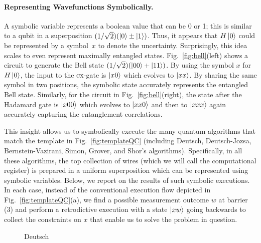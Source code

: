 \documentclass{article}
\newcommand{\cx}{\textsc{cx}}
\begin{document}
\begin{refsection}
\paragraph*{Representing Wavefunctions Symbolically.}
A symbolic variable represents a boolean value that can be 0 or 1;
this is similar to a qubit in a superposition $(1/\sqrt{2}) (\ket{0}
\pm \ket{1})$. Thus, it appears that $H\ket{0}$ could be represented
by a symbol~$x$ to denote the uncertainty. Surprisingly, this idea
scales to even represent maximally entangled
states. Fig.~\ref{fig:bell}(left) shows a circuit to generate the Bell
state $(1/\sqrt{2}) (\ket{00} + \ket{11})$. By using the symbol $x$
for $H\ket{0}$, the input to the \cx-gate is $\ket{x0}$ which
evolves to $\ket{xx}$. By sharing the same symbol in two positions,
the symbolic state accurately represents the entangled Bell
state. Similarly, for the circuit in Fig.~\ref{fig:bell}(right), the
state after the Hadamard gate is $\ket{x00}$ which evolves to
$\ket{xx0}$ and then to $\ket{xxx}$ again accurately capturing the
entanglement correlations.

This insight allows us to symbolically execute the many quantum
algorithms that match the template in Fig.~\ref{fig:templateQC}
(including Deutsch, Deutsch-Jozsa, Bernstein-Vazirani, Simon, Grover,
and Shor's algorithms). Specifically, in all these algorithms, the top
collection of wires (which we will call the computational register) is
prepared in a uniform superposition which can be represented using
symbolic variables. Below, we report on the results of such symbolic
executions. In each case, instead of the conventional execution flow
depicted in Fig.~\ref{fig:templateQC}(a), we find a possible
measurement outcome $w$ at barrier (3) and perform a retrodictive
execution with a state $\ket{xw}$ going backwards to collect the
constraints on $x$ that enable us to solve the problem in question.

\begin{wrapfigure}{r}{4cm}
\caption{\label{fig:deutsch}Deutsch}
\end{wrapfigure}

\end{refsection}
\end{document}
